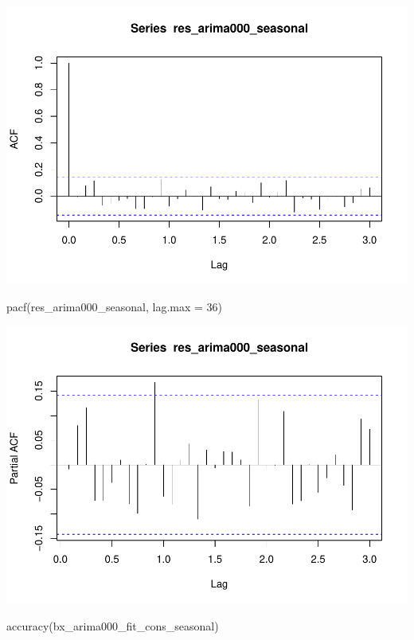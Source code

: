 \documentclass[
]{article}
\newenvironment{Shaded}{\begin{snugshade}}{\end{snugshade}}
\newcommand{\AttributeTok}[1]{\textcolor[rgb]{0.77,0.63,0.00}{#1}}
\newcommand{\DecValTok}[1]{\textcolor[rgb]{0.00,0.00,0.81}{#1}}
\newcommand{\FunctionTok}[1]{\textcolor[rgb]{0.00,0.00,0.00}{#1}}
\newcommand{\NormalTok}[1]{#1}
\begin{document}
\includegraphics{eighth_meeting_notes_files/figure-latex/unnamed-chunk-3-1.pdf}

\begin{Shaded}
\begin{Highlighting}[]
\FunctionTok{pacf}\NormalTok{(res\_arima000\_seasonal, }\AttributeTok{lag.max =} \DecValTok{36}\NormalTok{)}
\end{Highlighting}
\end{Shaded}

\includegraphics{eighth_meeting_notes_files/figure-latex/unnamed-chunk-3-2.pdf}

\begin{Shaded}
\begin{Highlighting}[]
\FunctionTok{accuracy}\NormalTok{(bx\_arima000\_fit\_cons\_seasonal)}
\end{Highlighting}
\end{Shaded}
\end{document}
